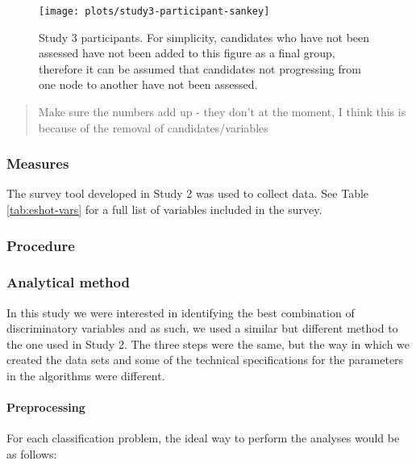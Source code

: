 \documentclass[a4paper,]{book}
\let\oldparagraph\paragraph
\renewcommand{\paragraph}[1]{\oldparagraph{#1}\mbox{}}
\begin{document}
\begin{figure}
\texttt{[image: plots/study3-participant-sankey]} \caption{Study 3 participants. For simplicity, candidates who have not been assessed have not been added to this figure as a final group, therefore it can be assumed that candidates not progressing from one node to another have not been assessed.}\label{fig:study3-participant-sankey}
\end{figure}

\begin{quote}
Make sure the numbers add up - they don't at the moment, I think this is because of the removal of candidates/variables
\end{quote}

\hypertarget{measures}{%
\subsubsection{Measures}\label{measures}}

The survey tool developed in Study 2 was used to collect data. See Table \ref{tab:eshot-vars} for a full list of variables included in the survey.

\hypertarget{procedure}{%
\subsubsection{Procedure}\label{procedure}}

\hypertarget{analytical-method}{%
\subsubsection{Analytical method}\label{analytical-method}}

In this study we were interested in identifying the best combination of discriminatory variables and as such, we used a similar but different method to the one used in Study 2. The three steps were the same, but the way in which we created the data sets and some of the technical specifications for the parameters in the algorithms were different.

\hypertarget{preprocessing}{%
\paragraph{Preprocessing}\label{preprocessing}}

For each classification problem, the ideal way to perform the analyses would be as follows:
\end{document}
